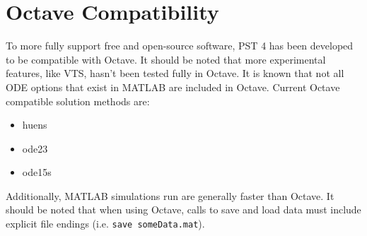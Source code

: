 \section{Octave Compatibility}
To more fully support free and open-source software, PST 4 has been developed to be compatible with Octave.
It should be noted that more experimental features, like VTS, hasn't been tested fully in Octave.
It is known that not all ODE options that exist in MATLAB are included in Octave.
Current Octave compatible solution methods are:
\begin{itemize}
 em
\singlespacing
\item huens
\item ode23
\item ode15s
\end{itemize}
Additionally, MATLAB simulations run are generally faster than Octave.
It should be noted that when using Octave, calls to save and load data must include explicit file endings (i.e. \verb|save someData.mat|).
